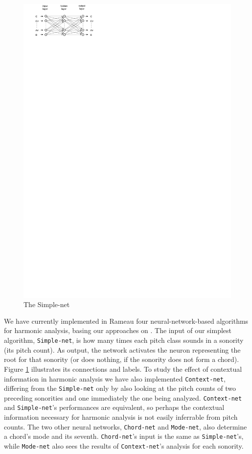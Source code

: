 \documentclass{article}
\begin{document}
\begin{figure}
  \includegraphics[]{neural-networks}
  \caption{The Simple-net}
  \label{fig:simple-net-diagram}
\end{figure}


We have currently implemented in Rameau four neural-network-based
algorithms for harmonic analysis, basing our approaches on
\cite{tsui:harmonic}. The input of our simplest algorithm,
\texttt{Simple\hyp{}net}, is how many times each pitch class sounds in
a sonority (its pitch count). As output, the network activates the
neuron representing the root for that sonority (or does nothing, if
the sonority does not form a chord). Figure
\ref{fig:simple-net-diagram} illustrates its connections and labels.
To study the effect of contextual information in harmonic analysis we
have also implemented \texttt{Context-net}, differing from the
\texttt{Simple\hyp{}net} only by also looking at the pitch counts of
two preceding sonorities and one immediately the one being analyzed.
\texttt{Context-net} and \texttt{Simple-net}'s performances are
equivalent, so perhaps the contextual information necessary for
harmonic analysis is not easily inferrable from pitch counts. The two
other neural networks, \texttt{Chord-net} and \texttt{Mode-net}, also
determine a chord's mode and its seventh. \texttt{Chord-net}'s input
is the same as \texttt{Simple-net}'s, while \texttt{Mode-net} also
sees the results of \texttt{Context-net}'s analysis for each sonority.
\end{document}
